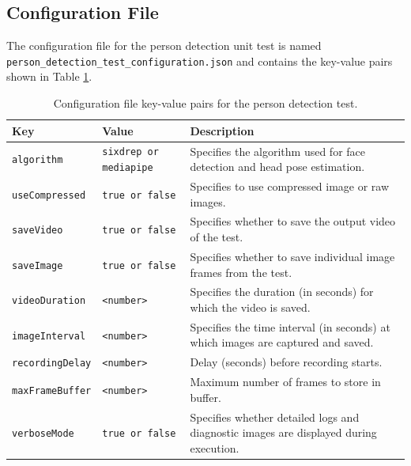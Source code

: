 \documentclass{CSSRforAfrica}
\begin{document}
\subsection*{Configuration File}
The configuration file for the person detection unit test is named \\
\texttt{person\_detection\_test\_configuration.json} and contains the  key-value pairs shown in Table \ref{tab:person_detection_key_value_pairs}.

\begin{table}[h!]
	\centering
	\renewcommand{\arraystretch}{1.2} %
	\begin{tabularx}{\linewidth}{|p{3.5cm}|p{4cm}|X|}
		\hline
		\rowcolor{blue!20} %
		\textbf{Key} & \textbf{Value} & \textbf{Description} \\
		\hline
		\texttt{algorithm}      & \texttt{sixdrep or mediapipe} & {\small Specifies the algorithm used for face detection and head pose estimation.} \\
		\hline
		\texttt{useCompressed}   & \texttt{true or false}       & {\small Specifies to use compressed image or raw images.} \\
		\hline
		\texttt{saveVideo}       & \texttt{true or false}       & {\small Specifies whether to save the output video of the test.} \\
		\hline
		\texttt{saveImage}       & \texttt{true or false}       & {\small Specifies whether to save individual image frames from the test.} \\
		\hline
		\texttt{videoDuration}   & \texttt{<number>}            & {\small Specifies the duration (in seconds) for which the video is saved.} \\
		\hline
		\texttt{imageInterval}   & \texttt{<number>}            & {\small Specifies the time interval (in seconds) at which images are captured and saved.} \\
		\hline
		\texttt{recordingDelay}  & \texttt{<number>}            & {\small Delay (seconds) before recording starts.} \\
		\hline
		\texttt{maxFrameBuffer}  & \texttt{<number>}            & {\small Maximum number of frames to store in buffer.} \\
		\hline
		\texttt{verboseMode}     & \texttt{true or false}       & {\small Specifies whether detailed logs and diagnostic images are displayed during execution.} \\
		\hline
	\end{tabularx}
	\caption{Configuration file key-value pairs for the person detection test.}
	\label{tab:person_detection_key_value_pairs}
\end{table}
\end{document}
